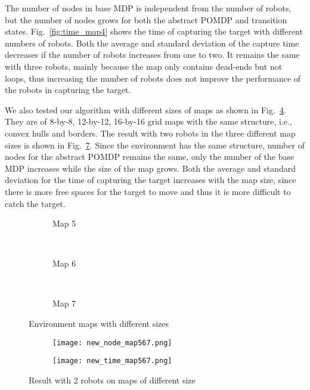 \documentclass[../main.tex]{subfiles}
\begin{document}
The number of nodes in base MDP is independent from the number of robots, but the number of nodes grows for both the abstract POMDP and transition states. Fig.~\ref{fig:time_map4} shows the time of capturing the target with different numbers of robots. Both the average and standard deviation of the capture time decreases if the number of robots increases from one to two. It remains the same with three robots, mainly because the map only contains dead-ends but not loops, thus increasing the number of robots does not improve the performance of the robots in capturing the target. 

We also tested our algorithm with different sizes of maps as shown in Fig.~\ref{fig:env_map_size}. They are of 8-by-8, 12-by-12, 16-by-16 grid maps with the same structure, i.e., convex hulls and borders. The result with two robots in the three different map sizes is shown in Fig.~\ref{fig:map456_r2}. Since the environment has the same structure, number of nodes for the abstract POMDP remains the same, only the number of the base MDP increases while the size of the map grows. Both the average and standard deviation for the time of capturing the target increases with the map size, since there is more free spaces for the target to move and thus it is more difficult to catch the target.

\begin{figure}
\captionsetup{skip=0pt}
    \centering
    \begin{subfigure}[b]{0.28\textwidth}
        \centering
        \caption{Map 5}
        \label{fig:map5}
    \end{subfigure}\
    \begin{subfigure}[b]{0.28\textwidth}
        \centering
        \caption{Map 6}
        \label{fig:map6}
    \end{subfigure}\
    \begin{subfigure}[b]{0.28\textwidth}
        \centering
        \caption{Map 7}
        \label{fig:map7}
    \end{subfigure}
    \caption{Environment maps with different sizes}
    \label{fig:env_map_size}%
\end{figure}


\begin{figure}%
\captionsetup{skip=0pt}
    \centering
    \begin{subfigure}[b]{0.48\textwidth}
        \centering
        \texttt{[image: new\_node\_map567.png]}
        \caption{}
        \label{fig:node_map456}
    \end{subfigure}
    \begin{subfigure}[b]{0.48\textwidth}
        \centering
        \texttt{[image: new\_time\_map567.png]}
        \caption{ }
        \label{fig:time_map456}
    \end{subfigure}
    \caption{Result with 2 robots on maps of different size}
    \label{fig:map456_r2}%
\end{figure}
\end{document}
